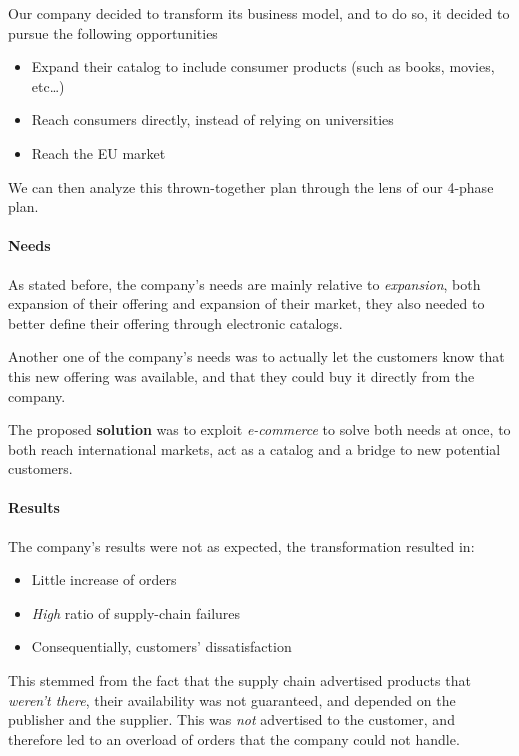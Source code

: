 \documentclass[openright, twoside, twocolumn, a4paper, 10pt]{report}
\begin{document}
Our company decided to transform its business model, and to do so, it decided to pursue the following opportunities

\begin{itemize}
	\item Expand their catalog to include consumer products (such as books, movies, etc\dots)
	\item Reach consumers directly, instead of relying on universities
	\item Reach the EU market
\end{itemize}

We can then analyze this thrown-together plan through the lens of our 4-phase plan.

\paragraph{Needs}

As stated before, the company's needs are mainly relative to \emph{expansion}, both expansion of their offering and expansion of their market, they also needed
to better define their offering through electronic catalogs.

Another one of the company's needs was to actually let the customers know that this new offering was available, and that they could buy it directly from the company.

The proposed \textbf{solution} was to exploit \emph{e-commerce} to solve both needs at once, to both reach international markets, act as a catalog and
a bridge to new potential customers.

\paragraph{Results}

The company's results were not as expected, the transformation resulted in:

\begin{itemize}
	\item Little increase of orders
	\item \emph{High} ratio of supply-chain failures
	\item Consequentially, customers' dissatisfaction
\end{itemize}

This stemmed from the fact that the supply chain advertised products that \emph{weren't there}, their availability was not guaranteed, and depended on
the publisher and the supplier. This was \emph{not} advertised to the customer, and therefore led to an overload of orders that the company could not
handle.
\end{document}

